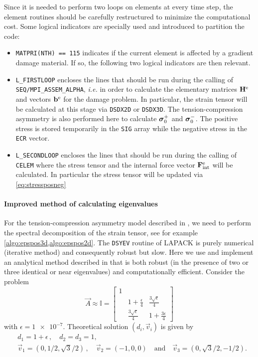 Since it is needed to perform two loops on elements at every time step, the element routines should be carefully restructured to minimize the computational cost. Some logical indicators are specially used and introduced to partition the code:
\begin{itemize}
\item \texttt{MATPRI(NTH) == 115} indicates if the current element is affected by a gradient damage material. If so, the following two logical indicators are then relevant.

\item \texttt{L\_FIRSTLOOP} encloses the lines that should be run during the calling of \texttt{SEQ/MPI\_ASSEM\_ALPHA}, \emph{i.e.} in order to calculate the elementary matrices $\vec{H}^\me$ and vectors $\vec{b}^\me$ for the damage problem. In particular, the strain tensor will be calculated at this stage via \texttt{DSDX2D} or \texttt{DSDX3D}. The tension-compression asymmetry is also performed here to calculate $\sig_0^+$ and $\sig_0^-$. The positive stress is stored temporarily in the \texttt{SIG} array while the negative stress in the \texttt{ECR} vector.

\item \texttt{L\_SECONDLOOP} encloses the lines that should be run during the calling of \texttt{CELEM} where the stress tensor and the internal force vector $\vec{F}_\mathrm{int}^\me$ will be calculated. In particular the stress tensor will be updated via \eqref{eq:stressposneg}
\end{itemize}

\paragraph{Improved method of calculating eigenvalues}
For the tension-compression asymmetry model described in \cite{MieheHofackerWelschinger:2010,FreddiRoyer-Carfagni:2010}, we need to perform the spectral decomposition of the strain tensor, see for example \cref{algo:epspos3d,algo:epspos2d}. The \texttt{DSYEV} routine of LAPACK is purely numerical (iterative method) and consequently robust but slow. Here we use and implement an analytical method described in \cite{Scherzinger:2008aa} that is both robust (in the presence of two or three identical or near eigenvalues) and computationally efficient. Consider the problem
\[
\vec{A}\approx\mathbb{I}=\begin{bmatrix}
1 & &  \\
& 1+\frac{\epsilon}{4} & \frac{3\sqrt{\epsilon}}{4} \\
& \frac{3\sqrt{\epsilon}}{4} & 1+\frac{3\epsilon}{4}
\end{bmatrix}
\]
with $\epsilon=\num{1e-7}$. Theoretical solution $(d_i,\vec{v}_i)$ is given by
\begin{equation} \label{eq:eigenvalueana}
\begin{aligned}
& d_1=1+\epsilon\,,\quad d_2=d_3=1, \\
& \vec{v}_1=(0, 1/2, \sqrt{3}/2)\,,\quad \vec{v}_2=(-1, 0, 0)\quad\text{and}\quad\vec{v}_3=(0, \sqrt{3}/2, -1/2).
\end{aligned}
\end{equation}

